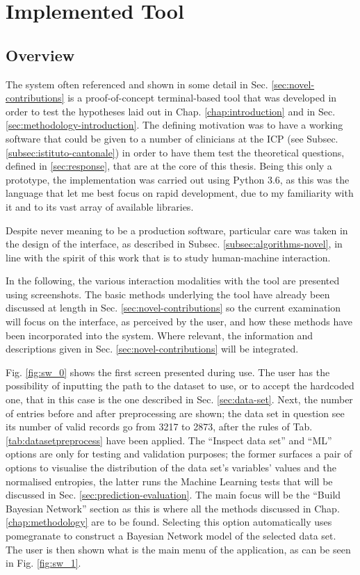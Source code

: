 \section{Implemented Tool} \label{sec:implemented-tool}
\subsection{Overview}
The system often referenced and shown in some detail in Sec. \ref{sec:novel-contributions} is a proof-of-concept terminal-based tool that was developed in order to test the hypotheses laid out in Chap. \ref{chap:introduction} and in Sec. \ref{sec:methodology-introduction}.
The defining motivation was to have a working software that could be given to a number of clinicians at the ICP (see Subsec. \ref{subsec:istituto-cantonale}) in order to have them test the theoretical questions, defined in \ref{sec:response}, that are at the core of this thesis.
Being this only a prototype, the implementation was carried out using Python 3.6, as this was the language that let me best focus on rapid development, due to my familiarity with it and to its vast array of available libraries.

Despite never meaning to be a production software, particular care was taken in the design of the interface, as described in Subsec. \ref{subsec:algorithms-novel}, in line with the spirit of this work that is to study human-machine interaction.

In the following, the various interaction modalities with the tool are presented using screenshots.
The basic methods underlying the tool have already been discussed at length in Sec. \ref{sec:novel-contributions} so the current examination will focus on the interface, as perceived by the user, and how these methods have been incorporated into the system.
Where relevant, the information and descriptions given in Sec. \ref{sec:novel-contributions} will be integrated.

Fig. \ref{fig:sw_0} shows the first screen presented during use.
The user has the possibility of inputting the path to the dataset to use, or to accept the hardcoded one, that in this case is the one described in Sec. \ref{sec:data-set}.
Next, the number of entries before and after preprocessing are shown; the data set in question see its number of valid records go from 3217 to 2873, after the rules of Tab. \ref{tab:datasetpreprocess} have been applied.
The \enquote{Inspect data set} and \enquote{ML} options are only for testing and validation purposes; the former surfaces a pair of options to visualise the distribution of the data set's variables' values and the normalised entropies, the latter runs the Machine Learning tests that will be discussed in Sec. \ref{sec:prediction-evaluation}.
The main focus will be the \enquote{Build Bayesian Network} section as this is where all the methods discussed in Chap. \ref{chap:methodology} are to be found.
Selecting this option automatically uses pomegranate to construct a Bayesian Network model of the selected data set.
The user is then shown what is the main menu of the application, as can be seen in Fig. \ref{fig:sw_1}.

